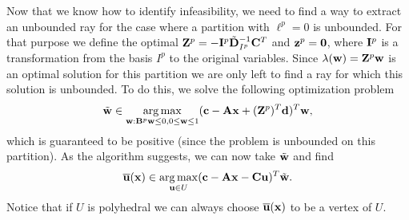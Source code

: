 \documentclass[12pt,x11names]{article}
\theoremstyle{definition}
\newcommand{\bzero}{{\bf 0}}
\newcommand{\bc}{{\bf c}}
\newcommand{\bd}{{\bf d}}
\newcommand{\bu}{{\bf u}}
\newcommand{\bw}{{\bf w}}
\newcommand{\bx}{{\bf x}}
\newcommand{\bz}{{\bf z}}
\newcommand{\bba}{{\bf A}}
\newcommand{\bbb}{{\bf B}}
\newcommand{\bbc}{{\bf C}}
\newcommand{\bbd}{{\bf D}}
\newcommand{\bbi}{{\bf I}}
\newcommand{\bbz}{{\bf Z}}
\DeclareMathOperator*{\argmax}{arg\,max}
\begin{document}
Now that we know how to identify infeasibility, we need to find a way to extract an unbounded ray for the case where a partition with $\ell^p=0$ is unbounded. For that purpose we define the optimal $\bbz^p=-\bbi^p\tilde{\bbd}_{I^p}^{-1}\bbc^T$ and $\bz^p=\bzero$, where $\bbi^p$ is a transformation from the  basis $I^p$ to the original variables. Since $\lambda(\bw)=\bbz^p\bw$ is an optimal solution for this partition we are only left to find a ray for which this solution is unbounded. To do this, we solve the following optimization problem
\begin{equation}\label{eq:FindingUnboundedRay_Partition}
\tilde{\bw}\in\argmax_{\bw:\bbb^p\bw\leq 0,0\leq\bw\leq 1} (\bc-\bba\bx+(\bbz^p)^T\bd)^T\bw,
\end{equation}
which is guaranteed to be positive (since the problem is unbounded on this partition).
As the algorithm suggests, we can now take $\tilde{\bw}$ and find 
$$\overline{\bu}(\bx)\in\argmax_{\bu\in U} (\bc-\bba\bx-\bbc\bu)^T\tilde{\bw}.$$ 
Notice that if $U$ is polyhedral we can always choose $\overline{\bu}(\bx)$ to be a vertex of $U$.
\end{document}
